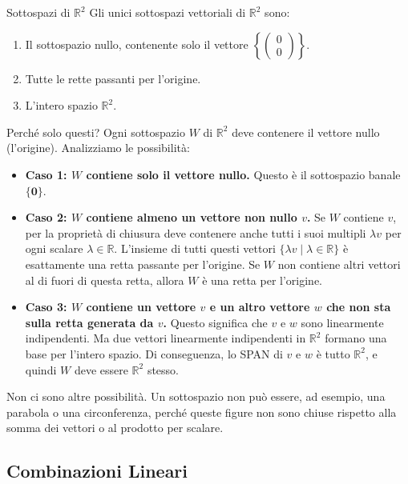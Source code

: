 \documentclass{article}
\begin{document}
\begin{theorem}{Sottospazi di $\mathbb{R}^2$}{}
    Gli unici sottospazi vettoriali di $\mathbb{R}^2$ sono:
    \begin{enumerate}
        \item Il sottospazio nullo, contenente solo il vettore $\left\{ \begin{pmatrix} 0 \\ 0 \end{pmatrix} \right\}$.
        \item Tutte le rette passanti per l'origine.
        \item L'intero spazio $\mathbb{R}^2$.
    \end{enumerate}
\end{theorem}

\begin{explanation}{Perché solo questi?}{}
    Ogni sottospazio $W$ di $\mathbb{R}^2$ deve contenere il vettore nullo (l'origine).
    Analizziamo le possibilità:
    \begin{itemize}
        \item \textbf{Caso 1: $W$ contiene solo il vettore nullo.} Questo è il sottospazio banale $\{\mathbf{0}\}$.
        \item \textbf{Caso 2: $W$ contiene almeno un vettore non nullo $v$.} Se $W$ contiene $v$, per la proprietà di chiusura deve contenere anche tutti i suoi multipli $\lambda v$ per ogni scalare $\lambda \in \mathbb{R}$. L'insieme di tutti questi vettori $\{\lambda v \mid \lambda \in \mathbb{R}\}$ è esattamente una retta passante per l'origine. Se $W$ non contiene altri vettori al di fuori di questa retta, allora $W$ è una retta per l'origine.
        \item \textbf{Caso 3: $W$ contiene un vettore $v$ e un altro vettore $w$ che non sta sulla retta generata da $v$.} Questo significa che $v$ e $w$ sono linearmente indipendenti. Ma due vettori linearmente indipendenti in $\mathbb{R}^2$ formano una base per l'intero spazio. Di conseguenza, lo SPAN di $v$ e $w$ è tutto $\mathbb{R}^2$, e quindi $W$ deve essere $\mathbb{R}^2$ stesso.
    \end{itemize}
    Non ci sono altre possibilità. Un sottospazio non può essere, ad esempio, una parabola o una circonferenza, perché queste figure non sono chiuse rispetto alla somma dei vettori o al prodotto per scalare.
\end{explanation}

\subsection{Combinazioni Lineari}
\end{document}
